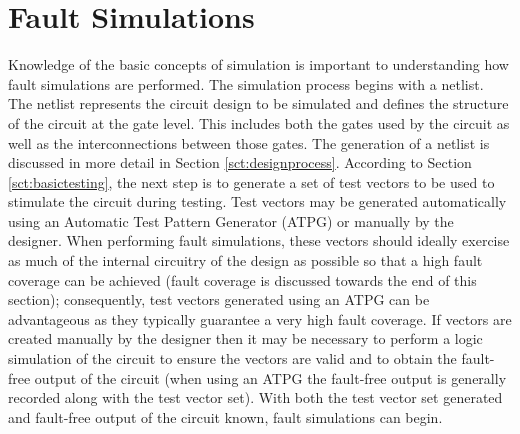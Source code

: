 \documentclass[12pt]{report}
\begin{document}
\section{Fault Simulations}
\label{sct:faultsim}
Knowledge of the basic concepts of simulation is important to understanding how fault simulations are performed.  The simulation process begins with a netlist.  The netlist represents the circuit design to be simulated and defines the structure of the circuit at the gate level.  This includes both the gates used by the circuit as well as the interconnections between those gates\cite{advancedverilog}.  The generation of a netlist is discussed in more detail in Section \ref{sct:designprocess}.  According to Section \ref{sct:basictesting}, the next step is to generate a set of test vectors to be used to stimulate the circuit during testing.  Test vectors may be generated automatically using an Automatic Test Pattern Generator (ATPG)\cite{advancedverilog} or manually by the designer.  When performing fault simulations, these vectors should ideally exercise as much of the internal circuitry of the design as possible so that a high fault coverage can be achieved (fault coverage is discussed towards the end of this section); consequently, test vectors generated using an ATPG can be advantageous as they typically guarantee a very high fault coverage\cite{advancedverilog}.  If vectors are created manually by the designer then it may be necessary to perform a logic simulation of the circuit to ensure the vectors are valid and to obtain the fault-free output of the circuit (when using an ATPG the fault-free output is generally recorded along with the test vector set).  With both the test vector set generated and fault-free output of the circuit known, fault simulations can begin.  
\end{document}
